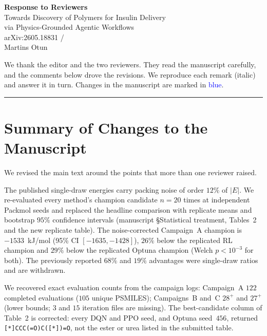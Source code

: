 \documentclass[11pt]{article}
\begin{document}
\begin{center}
  {\Large\textbf{Response to Reviewers}}\\[0.5em]
  {\large Towards Discovery of Polymers for Insulin Delivery\\
  via Physics-Grounded Agentic Workflows}\\[0.3em]
  {\normalsize arXiv:2605.18831 \quad / }\\[0.2em]
  {\normalsize Martins Otun}
\end{center}

\bigskip
\noindent We thank the editor and the two reviewers. They read the manuscript carefully, and the comments below drove the revisions.
We reproduce each remark (italic) and answer it in turn. Changes in the manuscript are marked in \textcolor{blue}{blue}.

\vspace{0.5cm}

\bigskip\hrule\bigskip

\section*{Summary of Changes to the Manuscript}

We revised the main text around the points that more than one reviewer raised.

The published single-draw energies carry packing noise of order $12\%$ of $|E|$.
We re-evaluated every method's champion candidate $n{=}20$ times at independent Packmol seeds and replaced the headline comparison with replicate means and bootstrap $95\%$ confidence intervals (manuscript \S Statistical treatment, Tables~2 and the new replicate table).
The noise-corrected Campaign~A champion is $-1533$~kJ/mol (95\% CI $[-1635,-1428]$), $26\%$ below the replicated RL champion and $29\%$ below the replicated Optuna champion (Welch $p<10^{-3}$ for both).
The previously reported $68\%$ and $19\%$ advantages were single-draw ratios and are withdrawn.

We recovered exact evaluation counts from the campaign logs: Campaign~A $122$ completed evaluations ($105$ unique PSMILES); Campaigns~B and~C $28^+$ and $27^+$ (lower bounds; $3$ and $15$ iteration files are missing).
The best-candidate column of Table~2 is corrected: every DQN and PPO seed, and Optuna seed~$456$, returned \texttt{[*]CCC(=O)C([*])=O}, not the ester or urea listed in the submitted table.
\end{document}

